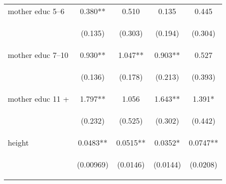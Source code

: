 \documentclass[]{article}
\begin{document}
\begin{center}
\begin{tabular}{lcccc}
mother educ 5--6 & 0.380** & 0.510 & 0.135 & 0.445 \\
\vspace{4pt} & \begin{footnotesize}(0.135)\end{footnotesize} & \begin{footnotesize}(0.303)\end{footnotesize} & \begin{footnotesize}(0.194)\end{footnotesize} & \begin{footnotesize}(0.304)\end{footnotesize} \\
mother educ 7--10 & 0.930** & 1.047** & 0.903** & 0.527 \\
\vspace{4pt} & \begin{footnotesize}(0.136)\end{footnotesize} & \begin{footnotesize}(0.178)\end{footnotesize} & \begin{footnotesize}(0.213)\end{footnotesize} & \begin{footnotesize}(0.393)\end{footnotesize} \\
mother educ 11 + & 1.797** & 1.056 & 1.643** & 1.391* \\
\vspace{4pt} & \begin{footnotesize}(0.232)\end{footnotesize} & \begin{footnotesize}(0.525)\end{footnotesize} & \begin{footnotesize}(0.302)\end{footnotesize} & \begin{footnotesize}(0.442)\end{footnotesize} \\
height & 0.0483** & 0.0515** & 0.0352* & 0.0747** \\
\vspace{4pt} & \begin{footnotesize}(0.00969)\end{footnotesize} & \begin{footnotesize}(0.0146)\end{footnotesize} & \begin{footnotesize}(0.0144)\end{footnotesize} & \begin{footnotesize}(0.0208)\end{footnotesize} \\

\end{tabular}
\end{center}
\end{document}
